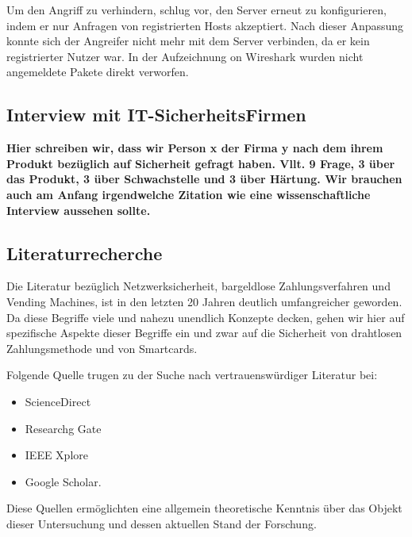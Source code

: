 Um den Angriff zu verhindern, schlug \cite{refip:NYRS} vor, den Server erneut zu konfigurieren, indem er 
nur Anfragen von registrierten Hosts akzeptiert. Nach dieser Anpassung konnte sich der Angreifer nicht 
mehr mit dem Server verbinden, da er kein registrierter Nutzer war. In der Aufzeichnung on Wireshark wurden
nicht angemeldete Pakete direkt verworfen.

\subsection{Interview mit IT-SicherheitsFirmen}

\textbf{Hier schreiben wir, dass wir Person x der Firma y nach dem ihrem Produkt bezüglich auf Sicherheit gefragt haben.
Vllt. 9 Frage, 3 über das Produkt, 3 über Schwachstelle und 3 über Härtung. Wir brauchen auch am Anfang irgendwelche Zitation
wie eine wissenschaftliche Interview aussehen sollte.}

\subsection{Literaturrecherche}

Die Literatur bezüglich Netzwerksicherheit, bargeldlose Zahlungsverfahren und Vending Machines, ist in den 
letzten 20 Jahren deutlich umfangreicher geworden. Da diese Begriffe viele und nahezu unendlich Konzepte 
decken, gehen wir hier auf spezifische Aspekte dieser Begriffe ein und zwar auf die Sicherheit von drahtlosen 
Zahlungsmethode und von Smartcards. 

Folgende Quelle trugen zu der Suche nach vertrauenswürdiger Literatur bei:

\begin{itemize}
    \item ScienceDirect
    \item Researchg Gate
    \item IEEE Xplore
    \item Google Scholar.
\end{itemize}

Diese Quellen ermöglichten eine allgemein theoretische Kenntnis über das Objekt dieser Untersuchung und dessen aktuellen 
Stand der Forschung.